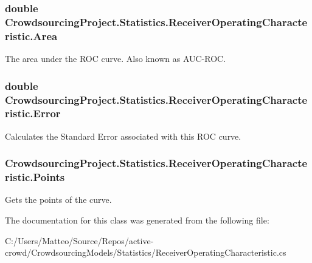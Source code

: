 \subsubsection[{Area}]{\setlength{\rightskip}{0pt plus 5cm}double Crowdsourcing\+Project.\+Statistics.\+Receiver\+Operating\+Characteristic.\+Area\hspace{0.3cm}{\ttfamily [get]}}\label{class_crowdsourcing_project_1_1_statistics_1_1_receiver_operating_characteristic_ac7cd3193e58dddd982b54b39a3284e1f}


The area under the R\+O\+C curve. Also known as A\+U\+C-\/\+R\+O\+C. 

\hypertarget{class_crowdsourcing_project_1_1_statistics_1_1_receiver_operating_characteristic_a122e8eb0e99a3b298f7370736114511a}{}
\subsubsection[{Error}]{\setlength{\rightskip}{0pt plus 5cm}double Crowdsourcing\+Project.\+Statistics.\+Receiver\+Operating\+Characteristic.\+Error\hspace{0.3cm}{\ttfamily [get]}}\label{class_crowdsourcing_project_1_1_statistics_1_1_receiver_operating_characteristic_a122e8eb0e99a3b298f7370736114511a}


Calculates the Standard Error associated with this R\+O\+C curve. 

\hypertarget{class_crowdsourcing_project_1_1_statistics_1_1_receiver_operating_characteristic_a0684231949d27fe15a40af511cedfa1e}{}
\subsubsection[{Points}]{ Crowdsourcing\+Project.\+Statistics.\+Receiver\+Operating\+Characteristic.\+Points\hspace{0.3cm}{\ttfamily [get]}}\label{class_crowdsourcing_project_1_1_statistics_1_1_receiver_operating_characteristic_a0684231949d27fe15a40af511cedfa1e}


Gets the points of the curve. 



The documentation for this class was generated from the following file\+:\begin{DoxyCompactItemize}
\item 
C\+:/\+Users/\+Matteo/\+Source/\+Repos/active-\/crowd/\+Crowdsourcing\+Models/\+Statistics/Receiver\+Operating\+Characteristic.\+cs\end{DoxyCompactItemize}
